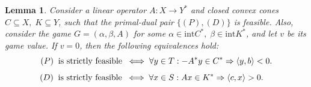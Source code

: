 \documentclass[11pt, twoside]{article}
\numberwithin{equation}{section}
\newtheorem{lemma}{Lemma}[section]
\theoremstyle{definition}
\begin{document}
\vspace{0.1cm}\begin{lemma}\label{lem:4.3}
    Consider a linear operator $A:X\rightarrow Y^*$ and closed convex cones $C\subseteq X,\;K\subseteq Y$, such that the primal-dual pair \hyperlink{primaldual}{$\{(P),(D)\}$} is feasible. Also, consider the game $G=(\alpha,\beta,A)$ for some $\alpha\in\text{int} C^*,\;\beta\in\text{int}K^*$, and let $v$ be its game value. If $v=0$, then the following equivalences hold:
    \begin{equation}\label{eq:4.4}
        (P) \mbox{\;\;is strictly feasible\;\;} \Longleftrightarrow\; \forall y\in T: -A^*y\in C^*\Rightarrow \langle y,b\rangle<0.
    \end{equation}
    \begin{equation}\label{eq:4.5}
        (D) \mbox{\;\;is strictly feasible\;\;} \Longleftrightarrow\; \forall x\in S: Ax\in K^*\Rightarrow \langle c,x\rangle>0.\;\;\;\;
    \end{equation}
\end{lemma}
\end{document}
